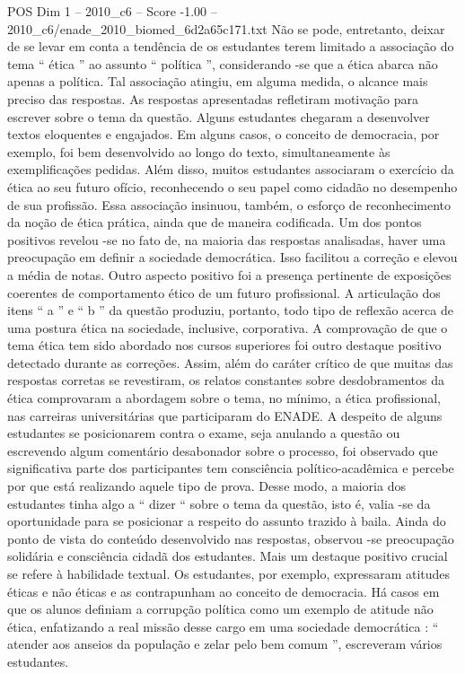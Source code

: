 \begin{textsample}{POS Dim 1 – 2010\_c6 – Score -1.00 – 2010\_c6/enade\_2010\_biomed\_6d2a65c171.txt}
Não se pode, entretanto, deixar de se levar em conta a tendência de os estudantes terem limitado a associação do tema “ ética ” ao assunto “ política ”, considerando -se que a ética abarca não apenas a política.
Tal associação atingiu, em alguma medida, o alcance mais preciso das respostas.
As respostas apresentadas refletiram motivação para escrever sobre o tema da questão.
Alguns estudantes chegaram a desenvolver textos eloquentes e engajados.
Em alguns casos, o conceito de democracia, por exemplo, foi bem desenvolvido ao longo do texto, simultaneamente às exemplificações pedidas.
Além disso, muitos estudantes associaram o exercício da ética ao seu futuro ofício, reconhecendo o seu papel como cidadão no desempenho de sua profissão.
Essa associação insinuou, também, o esforço de reconhecimento da noção de ética prática, ainda que de maneira codificada.
Um dos pontos positivos revelou -se no fato de, na maioria das respostas analisadas, haver uma preocupação em definir a sociedade democrática.
Isso facilitou a correção e elevou a média de notas.
Outro aspecto positivo foi a presença pertinente de exposições coerentes de comportamento ético de um futuro profissional.
A articulação dos itens “ a ” e “ b ” da questão produziu, portanto, todo tipo de reflexão acerca de uma postura ética na sociedade, inclusive, corporativa.
A comprovação de que o tema ética tem sido abordado nos cursos superiores foi outro destaque positivo detectado durante as correções.
Assim, além do caráter crítico de que muitas das respostas corretas se revestiram, os relatos constantes sobre desdobramentos da ética comprovaram a abordagem sobre o tema, no mínimo, a ética profissional, nas carreiras universitárias que participaram do ENADE.
A despeito de alguns estudantes se posicionarem contra o exame, seja anulando a questão ou escrevendo algum comentário desabonador sobre o processo, foi observado que significativa parte dos participantes tem consciência político-acadêmica e percebe por que está realizando aquele tipo de prova.
Desse modo, a maioria dos estudantes tinha algo a “ dizer “ sobre o tema da questão, isto é, valia -se da oportunidade para se posicionar a respeito do assunto trazido à baila.
Ainda do ponto de vista do conteúdo desenvolvido nas respostas, observou -se preocupação solidária e consciência cidadã dos estudantes.
Mais um destaque positivo crucial se refere à habilidade textual.
Os estudantes, por exemplo, expressaram atitudes éticas e não éticas e as contrapunham ao conceito de democracia.
Há casos em que os alunos definiam a corrupção política como um exemplo de atitude não ética, enfatizando a real missão desse cargo em uma sociedade democrática : “ atender aos anseios da população e zelar pelo bem comum ”, escreveram vários estudantes.

\end{textsample}
